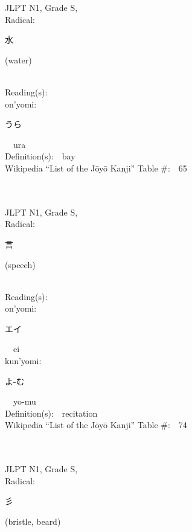 \begin{multicols}{2}
{JLPT N1, Grade S, \\Radical:\ \ {\begin{CJK}{UTF8}{min} 水 \end{CJK}} (water) } \\
Reading(s):\ \ \\
{\hspace*{1em}}on'yomi:\ \ \\
{\hspace*{2em}}{\begin{CJK}{UTF8}{min} うら \end{CJK}}\ \ ura\ \ \\
Definition(s):\ \ bay \\
Wikipedia ``List of the J\=oy\=o Kanji'' Table \#:\ \ 65 \\
\ \ \\
{\fontsize{34pt}{40pt}  }\ \ \\
{JLPT N1, Grade S, \\Radical:\ \ {\begin{CJK}{UTF8}{min} 言 \end{CJK}} (speech) } \\
Reading(s):\ \ \\
{\hspace*{1em}}on'yomi:\ \ \\
{\hspace*{2em}}{\begin{CJK}{UTF8}{min} エイ \end{CJK}}\ \ ei\ \ \\
{\hspace*{1em}}kun'yomi:\ \ \\
{\hspace*{2em}}{\begin{CJK}{UTF8}{min} よ-む \end{CJK}}\ \ yo-mu\ \ \\
Definition(s):\ \ recitation \\
Wikipedia ``List of the J\=oy\=o Kanji'' Table \#:\ \ 74 \\
\ \ \\
{\fontsize{34pt}{40pt}  }\ \ \\
{JLPT N1, Grade S, \\Radical:\ \ {\begin{CJK}{UTF8}{min} 彡 \end{CJK}} (bristle, beard) } \\

\end{multicols}
